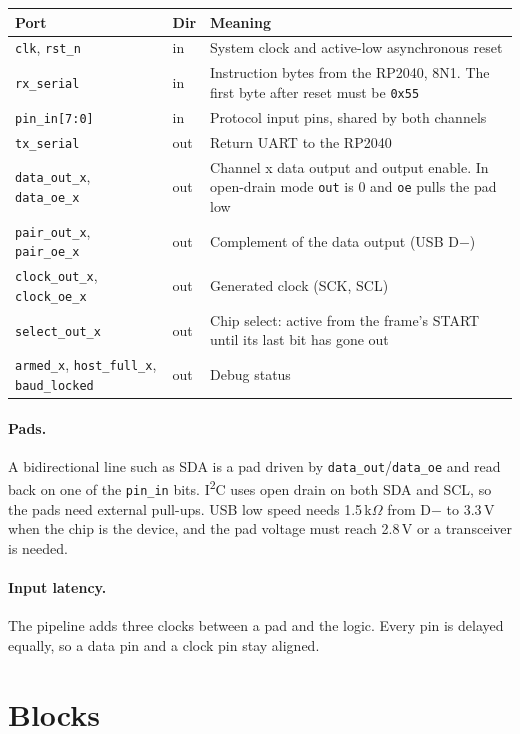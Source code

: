 \documentclass[11pt,a4paper]{article}
\newcommand{\sig}[1]{\texttt{#1}}
\begin{document}
\begin{center}
\begin{tabularx}{\linewidth}{@{}l l >{\raggedright\arraybackslash}X@{}}
\toprule
Port & Dir & Meaning \\
\midrule
\sig{clk}, \sig{rst\_n} & in & System clock and active-low asynchronous reset \\
\sig{rx\_serial} & in & Instruction bytes from the RP2040, 8N1. The first byte after reset must be \texttt{0x55} \\
\sig{pin\_in[7:0]} & in & Protocol input pins, shared by both channels \\
\sig{tx\_serial} & out & Return UART to the RP2040 \\
\sig{data\_out\_x}, \sig{data\_oe\_x} & out & Channel x data output and output enable. In open-drain mode \sig{out} is 0 and \sig{oe} pulls the pad low \\
\sig{pair\_out\_x}, \sig{pair\_oe\_x} & out & Complement of the data output (USB D$-$) \\
\sig{clock\_out\_x}, \sig{clock\_oe\_x} & out & Generated clock (SCK, SCL) \\
\sig{select\_out\_x} & out & Chip select: active from the frame's START until its last bit has gone out \\
\sig{armed\_x}, \sig{host\_full\_x}, \sig{baud\_locked} & out & Debug status \\
\bottomrule
\end{tabularx}
\end{center}

\paragraph{Pads.} A bidirectional line such as SDA is a pad driven by \sig{data\_out}/\sig{data\_oe} and read back on one of the \sig{pin\_in} bits. I\textsuperscript{2}C uses open drain on both SDA and SCL, so the pads need external pull-ups. USB low speed needs 1.5\,k$\Omega$ from D$-$ to 3.3\,V when the chip is the device, and the pad voltage must reach 2.8\,V or a transceiver is needed.

\paragraph{Input latency.} The pipeline adds three clocks between a pad and the logic. Every pin is delayed equally, so a data pin and a clock pin stay aligned.

\section{Blocks}
\end{document}

